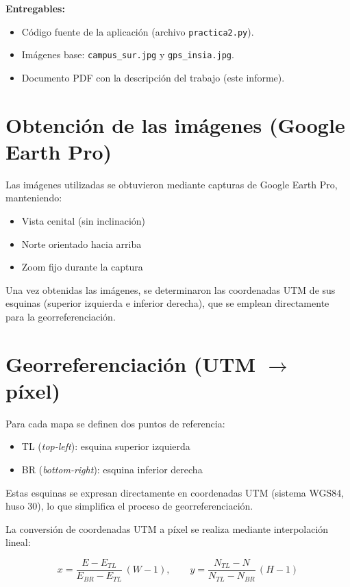 \documentclass[10pt]{article}
\begin{document}
\textbf{Entregables:}
\begin{itemize}[leftmargin=1.2em]
\item Código fuente de la aplicación (archivo \texttt{practica2.py}).
\item Imágenes base: \texttt{campus\_sur.jpg} y \texttt{gps\_insia.jpg}.
\item Documento PDF con la descripción del trabajo (este informe).
\end{itemize}

\section{Obtención de las imágenes (Google Earth Pro)}
Las imágenes utilizadas se obtuvieron mediante capturas de Google Earth Pro, manteniendo:

\begin{itemize}[leftmargin=1.2em]
\item Vista cenital (sin inclinación)
\item Norte orientado hacia arriba
\item Zoom fijo durante la captura
\end{itemize}

Una vez obtenidas las imágenes, se determinaron las coordenadas UTM de sus esquinas (superior izquierda e inferior derecha), que se emplean directamente para la georreferenciación.

\section{Georreferenciación (UTM $\rightarrow$ píxel)}

Para cada mapa se definen dos puntos de referencia:

\begin{itemize}[leftmargin=1.2em]
\item TL (\emph{top-left}): esquina superior izquierda
\item BR (\emph{bottom-right}): esquina inferior derecha
\end{itemize}

Estas esquinas se expresan directamente en coordenadas UTM (sistema WGS84, huso 30), lo que simplifica el proceso de georreferenciación.

La conversión de coordenadas UTM a píxel se realiza mediante interpolación lineal:

\[
x = \frac{E - E_{TL}}{E_{BR}-E_{TL}}\,(W-1), \qquad
y = \frac{N_{TL} - N}{N_{TL}-N_{BR}}\,(H-1)
\]
\end{document}
